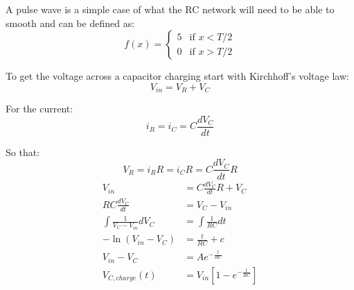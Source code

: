 \documentclass[11pt]{article}
\begin{document}
A pulse wave is a simple case of what the RC network will need to be able to smooth and can be defined as:
\begin{equation}
  f(x) =
  \begin{cases}
      5 & \text{if } x<T/2 \\
      0 & \text{if } x>T/2
  \end{cases}
\end{equation}


To get the voltage across a capacitor charging start with Kirchhoff's voltage law:
\begin{equation}
    V_{in} = V_R + V_C
\end{equation}

For the current:
\begin{equation}
  i_R = i_C = C \frac{dV_C}{dt}
\end{equation}

So that:
\begin{equation}
    V_R = i_R R = i_C R = C \frac{dV_C}{dt} R
\end{equation}
\begin{subequations}
  \begin{align}
    V_{in} &= C \frac{dV_C}{dt} R + V_C \\
    RC\frac{dV_C}{dt} &= V_C - V_{in} \\
    \int \frac{1}{V_C - V_{in}} dV_C &= \int \frac{1}{RC} dt \\
    -\ln(V_{in} - V_C) &= \frac{t}{RC} + c \\
    V_{in} - V_C &= Ae^{-\frac{t}{RC}} \\
    V_{C,charge}(t) &= V_{in}\left[1-e^{-\frac{t}{RC}}\right]
  \end{align}
\end{subequations}
\end{document}
